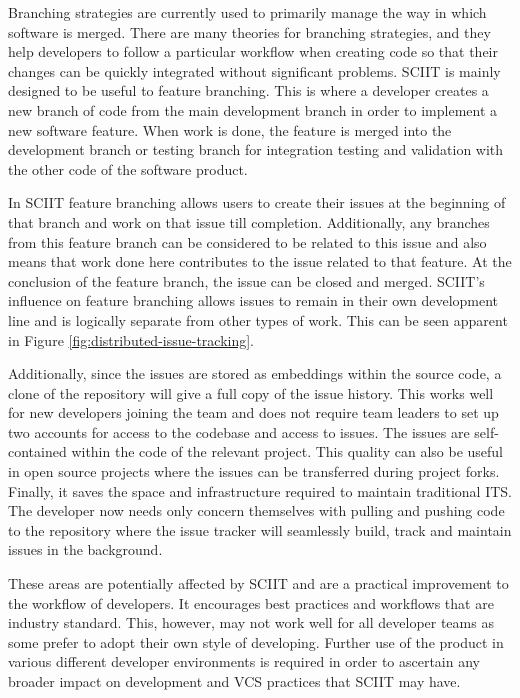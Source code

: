 \documentclass{mproj}
\begin{document}
Branching strategies are currently used to primarily manage the way in which software is merged. There are many theories for branching strategies, and they help developers to follow a particular workflow when creating code so that their changes can be quickly integrated without significant problems. SCIIT is mainly designed to be useful to feature branching. This is where a developer creates a new branch of code from the main development branch in order to implement a new software feature. When work is done, the feature is merged into the development branch or testing branch for integration testing and validation with the other code of the software product.

In SCIIT feature branching allows users to create their issues at the beginning of that branch and work on that issue till completion. Additionally, any branches from this feature branch can be considered to be related to this issue and also means that work done here contributes to the issue related to that feature. At the conclusion of the feature branch, the issue can be closed and merged. SCIIT’s influence on feature branching allows issues to remain in their own development line and is logically separate from other types of work. This can be seen apparent in Figure \ref{fig:distributed-issue-tracking}.


Additionally, since the issues are stored as embeddings within the source code, a clone of the repository will give a full copy of the issue history. This works well for new developers joining the team and does not require team leaders to set up two accounts for access to the codebase and access to issues. The issues are self-contained within the code of the relevant project. This quality can also be useful in open source projects where the issues can be transferred during project forks. Finally, it saves the space and infrastructure required to maintain traditional ITS. The developer now needs only concern themselves with pulling and pushing code to the repository where the issue tracker will seamlessly build, track and maintain issues in the background.

These areas are potentially affected by SCIIT and are a practical improvement to the workflow of developers. It encourages best practices and workflows that are industry standard. This, however, may not work well for all developer teams as some prefer to adopt their own style of developing. Further use of the product in various different developer environments is required in order to ascertain any broader impact on development and VCS practices that SCIIT may have.
\end{document}
